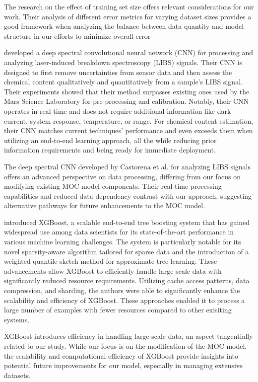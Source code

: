 The research on the effect of training set size offers relevant considerations for our work. Their analysis of different error metrics for varying dataset sizes provides a good framework when analyzing the balance between data quantity and model structure in our efforts to minimize overall error

\citeauthor{castorena_deep_2021} \cite{castorena_deep_2021} developed a deep spectral convolutional neural network (CNN) for processing and analyzing laser-induced breakdown spectroscopy (LIBS) signals.
Their CNN is designed to first remove uncertainties from sensor data and then assess the chemical content qualitatively and quantitatively from a sample's LIBS signal.
Their experiments showed that their method surpasses existing ones used by the Mars Science Laboratory for pre-processing and calibration.
Notably, their CNN operates in real-time and does not require additional information like dark current, system response, temperature, or range.
For chemical content estimation, their CNN matches current techniques' performance and even exceeds them when utilizing an end-to-end learning approach, all the while reducing prior information requirements and being ready for immediate deployment.

The deep spectral CNN developed by Castorena et al. for analyzing LIBS signals offers an advanced perspective on data processing, differing from our focus on modifying existing MOC model components. Their real-time processing capabilities and reduced data dependency contrast with our approach, suggesting alternative pathways for future enhancements to the MOC model.

\citeauthor{x} \cite{x} introduced XGBoost, a scalable end-to-end tree boosting system that has gained widespread use among data scientists for its state-of-the-art performance in various machine learning challenges. The system is particularly notable for its novel sparsity-aware algorithm tailored for sparse data and the introduction of a weighted quantile sketch method for approximate tree learning. These advancements allow XGBoost to efficiently handle large-scale data with significantly reduced resource requirements. Utilizing cache access patterns, data compression, and sharding, the authors were able to significantly enhance the scalability and efficiency of XGBoost. These approaches enabled it to process a large number of examples with fewer resources compared to other exisiting systems.

XGBoost introduces efficiency in handling large-scale data, an aspect tangentially related to our study. While our focus is on the modification of the MOC model, the scalability and computational efficiency of XGBoost provide insights into potential future improvements for our model, especially in managing extensive datasets.

